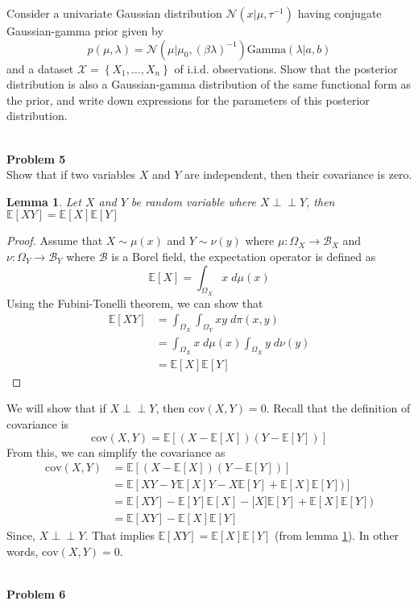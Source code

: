 \documentclass{article}
\newtheorem{lemma}[theorem]{Lemma}
\newcommand{\indep}{\perp \!\!\! \perp}
\begin{document}
Consider a univariate Gaussian distribution $\mathcal{N}(x|\mu, \tau^{-1})$ having conjugate Gaussian-gamma prior given by 
$$p(\mu,\lambda) = \mathcal{N}\left(\mu|\mu_0,(\beta\lambda)^{-1}\right)\text{Gamma}(\lambda|a,b)$$
and a dataset $\mathcal{X} = \left\{X_1,\dots,X_n\right\}$ of i.i.d. observations. Show that the posterior distribution is 
also a Gaussian-gamma distribution of the same functional form as the prior, and write down 
expressions for the parameters of this posterior distribution.

\leavevmode\\
\newpage
{}
\noindent
\Large{\textbf{Problem 5}}\normalsize
\\

Show that if two variables $X$ and $Y$ are independent, then their covariance is zero. 
\color{blue}
\begin{lemma}
\label{lemma:indepexp}
Let $X$ and $Y$ be random variable where $X\indep Y$, then $\mathbb{E}[XY] =  \mathbb{E}[X] \mathbb{E}[Y]$
\end{lemma}
\begin{proof}
    Assume that $X\sim \mu(x)$ and $Y\sim \nu(y)$ where $\mu:\Omega_X\to\mathcal{B}_X$ and $\nu:\Omega_Y\to\mathcal{B}_Y$ where $\mathcal{B}$ is a Borel field, the expectation operator is defined as
    $$\mathbb{E}[X] = \int_{\Omega_X} x\;d\mu(x)$$
    Using the Fubini-Tonelli theorem, we can show that
    \begin{align*}
    \mathbb{E}[XY] &= \int_{\Omega_X}\int_{\Omega_Y} xy\;d\pi(x,y)\\
    &= \int_{\Omega_X} x\;d\mu(x)\int_{\Omega_X} y\;d\nu(y)\\
    &= \mathbb{E}[X]\mathbb{E}[Y]
    \end{align*}
\end{proof}
\begin{sol}
We will show that if $X\indep Y$, then $\text{cov}(X,Y) = 0$.
Recall that the definition of covariance is 
\begin{equation}\text{cov}(X,Y) = \mathbb{E}\left[(X-\mathbb{E}[X])(Y-\mathbb{E}[Y])\right]\end{equation}
From this, we can simplify the covariance as
\begin{align*}
    \text{cov}(X,Y) &= \mathbb{E}\left[(X-\mathbb{E}[X])(Y-\mathbb{E}[Y])\right] \\
     &= \mathbb{E}\left[XY-Y\mathbb{E}[X]Y - X\mathbb{E}[Y]  +\mathbb{E}[X] \mathbb{E}[Y])\right] \\
     &= \mathbb{E}[XY] - \mathbb{E}[Y]\mathbb{E}[X] - \mathbb[X]\mathbb{E}[Y]  +\mathbb{E}[X] \mathbb{E}[Y]) \\
     &= \mathbb{E}[XY] - \mathbb{E}[X] \mathbb{E}[Y]
\end{align*}
Since, $X\indep Y$. That implies $\mathbb{E}[XY] =  \mathbb{E}[X] \mathbb{E}[Y]$ (from lemma \ref{lemma:indepexp}). In other words, $\text{cov}(X,Y) = 0$.
\end{sol}
\color{black}
\leavevmode\\
\noindent
\Large{\textbf{Problem 6}}\normalsize
\\
\end{document}
